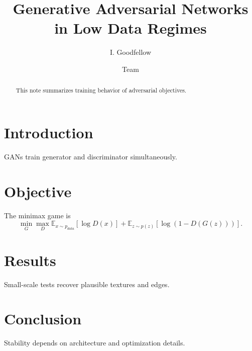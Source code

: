 \documentclass[conference]{IEEEtran}
\title{Generative Adversarial Networks in Low Data Regimes}
\author{I. Goodfellow \and Team}
\begin{document}
\maketitle
\begin{abstract}
This note summarizes training behavior of adversarial objectives.
\end{abstract}
\section{Introduction}
GANs train generator and discriminator simultaneously.
\section{Objective}
The minimax game is
\begin{equation}
\min_G \max_D \mathbb{E}_{x\sim p_{data}}[\log D(x)] + \mathbb{E}_{z\sim p(z)}[\log(1-D(G(z)))].
\end{equation}
\section{Results}
Small-scale tests recover plausible textures and edges.
\section{Conclusion}
Stability depends on architecture and optimization details.


\end{document}

